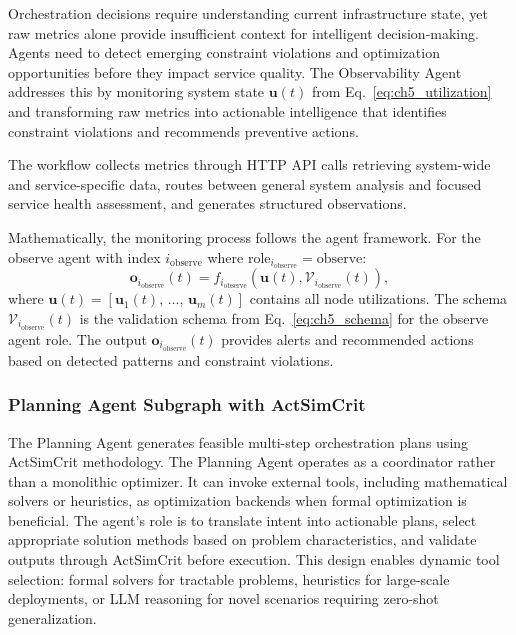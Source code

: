 Orchestration decisions require understanding current infrastructure state, yet raw metrics alone provide insufficient context for intelligent decision-making. Agents need to detect emerging constraint violations and optimization opportunities before they impact service quality. The Observability Agent addresses this by monitoring system state $\mathbf{u}(t)$ from Eq.~\ref{eq:ch5_utilization} and transforming raw metrics into actionable intelligence that identifies constraint violations and recommends preventive actions.

The workflow collects metrics through \ac{HTTP} \ac{API} calls retrieving system-wide and service-specific data, routes between general system analysis and focused service health assessment, and generates structured observations.

Mathematically, the monitoring process follows the agent framework. For the observe agent with index $i_{\text{observe}}$ where $\text{role}_{i_{\text{observe}}} = \text{observe}$:
\begin{equation}
\mathbf{o}_{i_{\text{observe}}}(t) = f_{i_{\text{observe}}}(\mathbf{u}(t), \mathcal{V}_{i_{\text{observe}}}(t)),
\label{eq:ch5_observe_agent}
\end{equation}
where $\mathbf{u}(t) = [\mathbf{u}_1(t),\, \ldots,\, \mathbf{u}_m(t)]$ contains all node utilizations. The schema $\mathcal{V}_{i_{\text{observe}}}(t)$ is the validation schema from Eq.~\ref{eq:ch5_schema} for the observe agent role. The output $\mathbf{o}_{i_{\text{observe}}}(t)$ provides alerts and recommended actions based on detected patterns and constraint violations.

\subsubsection{Planning Agent Subgraph with ActSimCrit}
\label{subsec:ch5_planning_agent}

The Planning Agent generates feasible multi-step orchestration plans using \ac{ActSimCrit} methodology. The Planning Agent operates as a coordinator rather than a monolithic optimizer. It can invoke external tools, including mathematical solvers or heuristics, as optimization backends when formal optimization is beneficial. The agent's role is to translate intent into actionable plans, select appropriate solution methods based on problem characteristics, and validate outputs through \ac{ActSimCrit} before execution. This design enables dynamic tool selection: formal solvers for tractable problems, heuristics for large-scale deployments, or \ac{LLM} reasoning for novel scenarios requiring zero-shot generalization.

